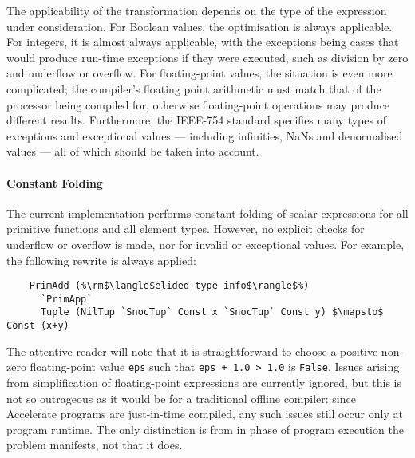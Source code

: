 The applicability of the transformation depends on the type of the expression
under consideration. For Boolean values, the optimisation is always applicable.
For integers, it is almost always applicable, with the exceptions being cases
that would produce run-time exceptions if they were executed, such as division
by zero and underflow or overflow. For floating-point values, the situation is
even more complicated; the compiler's floating point arithmetic must match that
of the processor being compiled for, otherwise floating-point operations may
produce different results. Furthermore, the IEEE-754 standard specifies many
types of exceptions and exceptional values --- including infinities, NaNs and
denormalised values --- all of which should be taken into account.


\paragraph{Constant Folding}

The current implementation performs constant folding of scalar expressions for
all primitive functions and all element types. However, no explicit checks for
underflow or overflow is made, nor for invalid or exceptional values. For
example, the following rewrite is always applied:
%
%
\begin{lstlisting}[style=Haskell,numbers=none,mathescape]
%\bf$\langle$ constant folding $\rangle$%
    PrimAdd (%\rm$\langle$elided type info$\rangle$%)
      `PrimApp`
      Tuple (NilTup `SnocTup` Const x `SnocTup` Const y) $\mapsto$ Const (x+y)
\end{lstlisting}
%
The attentive reader will note that it is straightforward to choose a positive
non-zero floating-point value \texttt{eps} such that \lstinline{eps + 1.0 > 1.0}
is \texttt{False}. Issues arising from simplification of floating-point
expressions are currently ignored, but this is not so outrageous as it would be
for a traditional offline compiler: since Accelerate programs are just-in-time
compiled, any such issues still occur only at program runtime. The only
distinction is from in phase of program execution the problem manifests, not
that it does.



